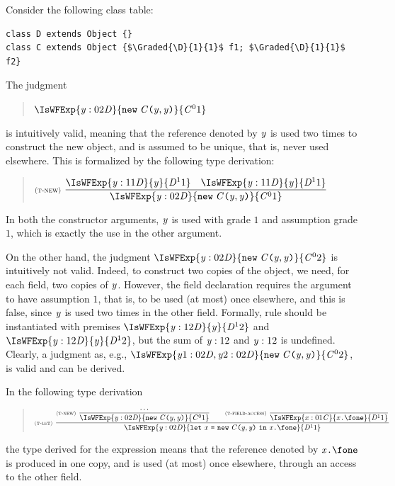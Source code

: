 \begin{example}
Consider the following class table:
\begin{lstlisting}
class D extends Object {}
class C extends Object {$\Graded{\D}{1}{1}$ f1; $\Graded{\D}{1}{1}$ f2}
\end{lstlisting} 
The judgment
\begin{quote}
$\IsWFExp{\CtxElem{\y}{0}{2}{\D}}{\New{\C}{\y,\y}}{{\Graded{\C}{0}{1}}}$
\end{quote}
is intuitively valid, meaning that the reference denoted by $\mathit{y}$ is used two times to construct the new object, and is assumed to be unique, that is, never used elsewhere. 
 This is formalized by the following type derivation:
\begin{quote}
$
\NamedRule{t-new}{\IsWFExp{\CtxElem{\y}{1}{1}{\D}}{\y}{\Graded{\D}{1}{1}}\Space\IsWFExp{\CtxElem{\y}{1}{1}{\D}}{\y}{\Graded{\D}{1}{1}}}{\IsWFExp{\CtxElem{\y}{0}{2}{\D}}{\New{\C}{\y,\y}}{{\Graded{\C}{0}{1}}}}{
 }
 $
\end{quote}
In both the constructor arguments, $\mathit{y}$ is used with grade $1$ and assumption grade $1$, which is exactly the use in the other argument. 

On the other hand, the judgment $\IsWFExp{\CtxElem{\y}{0}{2}{\D}}{\New{\C}{\y,\y}}{{\Graded{\C}{0}{2}}}$ is intuitively not valid. Indeed, to construct two copies of the object, we need, for each field, two copies of $\mathit{y}$. However, the field declaration requires the argument to have assumption $1$, that is, to be used (at most) once elsewhere, and this is false, since $\mathit{y}$ is used two times in the other field.
Formally, rule  should be instantiated with premises $\IsWFExp{\CtxElem{\y}{1}{2}{\D}}{\y}{\Graded{\D}{1}{2}}$ and $\IsWFExp{\CtxElem{\y}{1}{2}{\D}}{\y}{\Graded{\D}{1}{2}}$, but the sum of 
$\mathit{y} :1{2}$ and $\mathit{y} :1{2}$ is undefined. Clearly, a judgment as, e.g., $\IsWFExp{\CtxElem{\y1}{0}{2}{\D},\CtxElem{\y2}{0}{2}{\D}}{\New{\C}{\y,\y}}{{\Graded{\C}{0}{2}}}$, is valid and can be derived. 
\end{example}

\begin{example}\label{ex:field-access}
In the following type derivation
\begin{quote}
$\NamedRule{t-let}{
\NamedRule{t-new}{\ldots}{\IsWFExp{\CtxElem{\y}{0}{2}{\D}}{\New{\C}{\y,\y}}{{\Graded{\C}{0}{1}}}}{}
\BigSpace
\NamedRule{t-field-access}{}{\IsWFExp{\CtxElem{\x}{0}{1}{\C}}{\FieldAccess{\x}{\fone}}{\Graded{\D}{1}{1}}}{}
}{\IsWFExp{\CtxElem{\y}{0}{2}{\D}}{\Let{\x}{\New{\C}{\y,\y}}{\FieldAccess{\x}{\fone}}}{\Graded{\D}{1}{1}}}{}$
\end{quote}
the type derived for the expression means that the reference denoted by $\FieldAccess{\x}{\fone}$ is produced in one copy,  and is used (at most) once elsewhere, through an access to the other field. 
\end{example}
\eez

